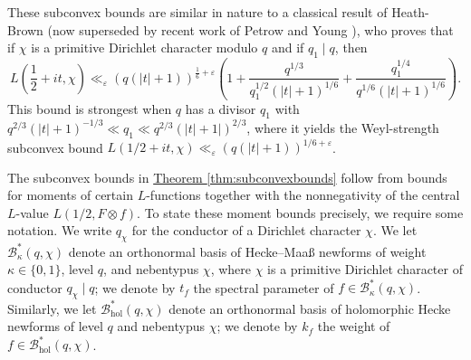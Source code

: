 \documentclass[11pt,a4paper]{amsart}
\newcommand{\BB}{\mathcal{B}}
\newcommand{\e}{\varepsilon}
\newcommand{\hol}{\mathrm{hol}}
\numberwithin{equation}{section}
\theoremstyle{remark}
\theoremstyle{definition}
\begin{document}
These subconvex bounds are similar in nature to a classical result of Heath-Brown \cite[Theorem 2]{H-B78} (now superseded by recent work of Petrow and Young \cite{PY20,PY23}), who proves that if $\chi$ is a primitive Dirichlet character modulo $q$ and if $q_1 \mid q$, then
\[L\left(\frac{1}{2} + it,\chi\right) \ll_{\e} (q(|t| + 1))^{\frac{1}{6} + \e} \left(1 + \frac{q^{1/3}}{q_1^{1/2} (|t| + 1)^{1/6}} + \frac{q_1^{1/4}}{q^{1/6} (|t| + 1)^{1/6}}\right).\]
This bound is strongest when $q$ has a divisor $q_1$ with $q^{2/3} (|t| + 1)^{-1/3} \ll q_1 \ll q^{2/3} (|t| + 1|)^{2/3}$, where it yields the Weyl-strength subconvex bound $L(1/2 + it,\chi) \ll_{\e} (q(|t| + 1))^{1/6 + \e}$. 

The subconvex bounds in \hyperref[thm:subconvexbounds]{Theorem \ref*{thm:subconvexbounds}} follow from bounds for moments of certain $L$-functions together with the nonnegativity of the central $L$-value $L(1/2,F \otimes f)$. To state these moment bounds precisely, we require some notation. We write $q_{\chi}$ for the conductor of a Dirichlet character $\chi$. We let $\BB_{\kappa}^{\ast}(q,\chi)$ denote an orthonormal basis of Hecke--Maa\ss{} newforms of weight $\kappa \in \{0,1\}$, level $q$, and nebentypus $\chi$, where $\chi$ is a primitive Dirichlet character of conductor $q_{\chi} \mid q$; we denote by $t_f$ the spectral parameter of $f \in \BB_{\kappa}^{\ast}(q,\chi)$. Similarly, we let $\BB_{\hol}^{\ast}(q,\chi)$ denote an orthonormal basis of holomorphic Hecke newforms of level $q$ and nebentypus $\chi$; we denote by $k_f$ the weight of $f \in \BB_{\hol}^{\ast}(q,\chi)$.
\end{document}
